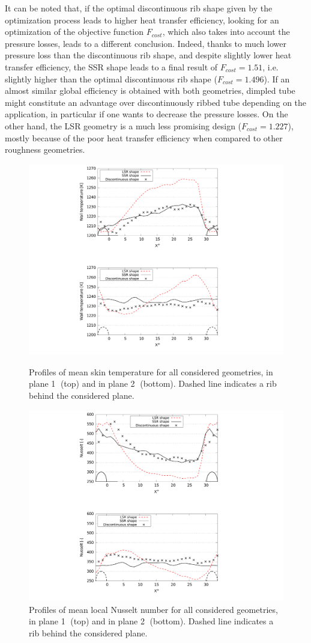 It can be noted that, if the optimal discontinuous rib shape given by the optimization process leads to higher heat transfer efficiency, looking for an optimization of the objective function $F_{cost}$, which also takes into account the pressure losses, leads to a different conclusion. Indeed, thanks to much lower pressure loss than the discontinuous rib shape, and despite slightly lower heat transfer efficiency, the SSR shape leads to a final result of $F_{cost} = 1.51$, i.e. slightly higher than the optimal discontinuous rib shape ($F_{cost} = 1.496$). If an almost similar global efficiency is obtained with both geometries, dimpled tube might constitute an advantage over discontinuously ribbed tube depending on the application, in particular if one wants to decrease the pressure losses. On the other hand, the LSR geometry is a much less promising design ($F_{cost}=1.227$), mostly because of the poor heat transfer efficiency when compared to other roughness geometries.

\begin{figure}[h]
\begin{minipage}[c]{1.0\linewidth}
\centering
\includegraphics[width=0.55\linewidth]{fig/applications/optim/Twall_profile_compare.pdf}
\caption{Profiles of mean skin temperature for all considered geometries, in plane \textcircled{1} (top) and in plane \textcircled{2} (bottom). Dashed line indicates a rib behind the considered plane.}
\label{Twall_profile_compare}
\end{minipage}

\begin{minipage}[c]{1.0\linewidth}
\centering
\includegraphics[width=0.55\linewidth]{fig/applications/optim/Nusselt_compare.pdf}
\caption{Profiles of mean local Nusselt number for all considered geometries, in plane \textcircled{1} (top) and in plane \textcircled{2} (bottom). Dashed line indicates a rib behind the considered plane.}
\label{Nusselt_compare}
\end{minipage}
\end{figure}

